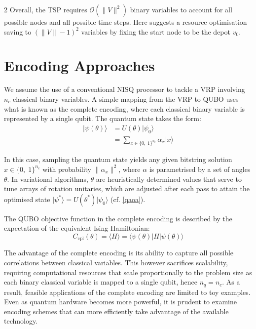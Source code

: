 \documentclass [10pt]{article}
\newcommand {\qvec}[1] {\vert #1 \rangle}
\newcommand {\qcovec}[1] {\langle #1 \vert}
\newcommand {\qeval}[1] {\langle #1 \rangle}
\newcommand {\qnorm}[1] {\lVert #1 \rVert}
\begin{document}
\begin {multicols}{2}
Overall, the TSP requires $\mathcal{O}(\qnorm{V}^2)$ binary variables to account
for all possible nodes and all possible time steps. Here \cite{isingnp} suggests
a resource optimisation saving to $(\qnorm{V} - 1)^2$ variables by fixing the
start node to be the depot $v_0$.



\section {Encoding Approaches}
We assume the use of a conventional NISQ processor to tackle a VRP involving
$n_c$ classical binary variables. A simple mapping from the VRP to QUBO uses
what is known as the complete encoding, where each classical binary variable
is represented by a single qubit. The quantum state takes the form:
\begin {align}
\qvec{\psi(\theta)} 
&= U(\theta)\qvec{\psi_0} \\
&= \sum_{x \in \{0, \; 1\}^{n_c}} \alpha_x \qvec{x}
\end {align}

In this case, sampling the quantum state yields any given bitstring solution
${x \in \{0, \; 1\}^{n_c}}$ with probability $\qnorm{\alpha_x}^2$, where
$\alpha$ is parametrised by a set of angles $\theta$. In variational
algorithms, $\theta$ are heuristically determined values that serve to tune
arrays of rotation unitaries, which are adjusted after each pass to attain
the optimised state $\qvec{\psi^*} = U(\theta^*)\qvec{\psi_0}$
(cf. \eqref{qaoa}).

The QUBO objective function in the complete encoding is described by the
expectation of the equivalent Ising Hamiltonian:
\begin {equation}
C_{\text{cpl}}(\theta) = \qeval{H} = \qcovec{\psi(\theta)} H \qvec{\psi(\theta)}
\end {equation}


The advantage of the complete encoding is its ability to capture all
possible correlations between classical variables. This however sacrifices
scalability, requiring computational resources that scale proportionally
to the problem size as each binary classical variable is mapped to a
single qubit, hence $n_q = n_c$. As a result, feasible applications of the
complete encoding are limited to toy examples. Even as quantum hardware
becomes more powerful, it is prudent to examine encoding schemes that can more
efficiently take advantage of the available technology.


\end{multicols}
\end{document}
